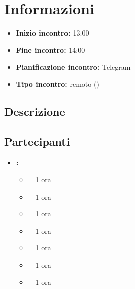 \section{Informazioni}
\begin{itemize}
	\item \textbf{Inizio incontro:} 13:00
	\item \textbf{Fine incontro:} 14:00
	\item \textbf{Pianificazione incontro:} Telegram
	\item \textbf{Tipo incontro:} remoto ()
\end{itemize}

\subsection{Descrizione}
\DocDescription

\subsection{Partecipanti}

\begin{itemize}
	\item \textbf{\GroupName:}
	\begin{itemize}
		\item \tommaso \ \rightarrow\ 1 ora
		\item \marco \ \rightarrow\ 1 ora
		\item \raul \ \rightarrow\ 1 ora
		\item \sebastiano \ \rightarrow\ 1 ora
		\item \martina \ \rightarrow\ 1 ora
		\item \riccardo \ \rightarrow\ 1 ora
		\item \mattia \ \rightarrow\ 1 ora
	\end{itemize}
\end{itemize}

\clearpage

